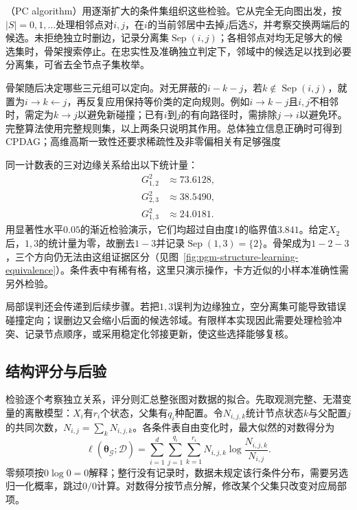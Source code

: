 （PC algorithm）用逐渐扩大的条件集组织这些检验。它从完全无向图出发，按$|S|=0,1,\ldots$处理相邻点对$i,j$，在$i$的当前邻居中去掉$j$后选$S$，并考察交换两端后的候选。未拒绝独立时删边，记录分离集$\operatorname{Sep}(i,j)$；各相邻点对均无足够大的候选集时，骨架搜索停止。在忠实性及准确独立判定下，邻域中的候选足以找到必要分离集，可省去全节点子集枚举。

骨架随后决定哪些三元组可以定向。对无屏蔽的$i-k-j$，若$k\notin\operatorname{Sep}(i,j)$，就置为$i\to k\leftarrow j$，再反复应用保持等价类的定向规则。例如$i\to k-j$且$i,j$不相邻时，需定为$k\to j$以避免新碰撞；已有$i$到$j$的有向路径时，需排除$j\to i$以避免环。完整算法使用完整规则集，以上两条只说明其作用。总体独立信息正确时可得到CPDAG；高维高斯一致性还要求稀疏性及非零偏相关有足够强度

同一计数表的三对边缘关系给出以下统计量：
\[
  \begin{aligned}
    G^2_{1,2}&\approx73.6128,\\
    G^2_{2,3}&\approx38.5490,\\
    G^2_{1,3}&\approx24.0181.
  \end{aligned}
\]
用显著性水平$0.05$的渐近检验演示，它们均超过自由度1的临界值$3.841$。给定$X_2$后，$1,3$的统计量为零，故删去$1-3$并记录$\operatorname{Sep}(1,3)=\{2\}$。骨架成为$1-2-3$，三个方向仍无法由这组证据区分（见图~\ref{fig:pgm-structure-learning-equivalence}）。条件表中有稀有格，这里只演示操作，卡方近似的小样本准确性需另外检验。

局部误判还会传递到后续步骤。若把$1,3$误判为边缘独立，空分离集可能导致错误碰撞定向；误删边又会缩小后面的候选邻域。有限样本实现因此需要处理检验冲突、记录节点顺序，或采用稳定化邻接更新，使这些选择能够复核。

\subsection{结构评分与后验}
\label{sec:pgm-structure-learning-scores}

检验逐个考察独立关系，评分则汇总整张图对数据的拟合。先取观测完整、无潜变量的离散模型：$X_i$有$r_i$个状态，父集有$q_i$种配置。令$N_{i,j,k}$统计节点状态$k$与父配置$j$的共同次数，$N_{i,j}=\sum_kN_{i,j,k}$。各条件表自由变化时，最大似然的对数得分为
\begin{equation}
  \ell(\widehat{\bm{\theta}}_{\mathcal{G}};\mathcal{D})
  =\sum_{i=1}^{d}\sum_{j=1}^{q_i}\sum_{k=1}^{r_i}
    N_{i,j,k}\log\frac{N_{i,j,k}}{N_{i,j}}.
  \label{eq:pgm-structure-learning-local-likelihood}
\end{equation}
零频项按$0\log0=0$解释；整行没有记录时，数据未规定该行条件分布，需要另选归一化概率，跳过$0/0$计算。对数得分按节点分解，修改某个父集只改变对应局部项。

